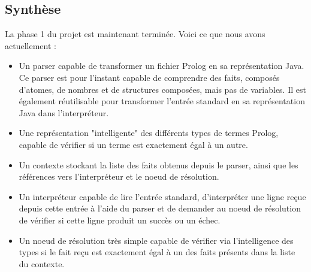 \documentclass[../report.tex]{subfiles}
\begin{document}
\subsection{Synthèse}
La phase 1 du projet est maintenant terminée. Voici ce que nous avons actuellement :
\begin{itemize}
    \item Un parser capable de transformer un fichier Prolog en sa représentation Java. Ce parser est pour l'instant capable de comprendre des faits, composés d'atomes, de nombres et de structures composées, mais pas de variables. Il est également réutilisable pour transformer l'entrée standard en sa représentation Java dans l'interpréteur.
    \item Une représentation "intelligente" des différents types de termes Prolog, capable de vérifier si un terme est exactement égal à un autre.
    \item Un contexte stockant la liste des faits obtenus depuis le parser, ainsi que les références vers l'interpréteur et le noeud de résolution.
    \item Un interpréteur capable de lire l'entrée standard, d'interpréter une ligne reçue depuis cette entrée à l'aide du parser et de demander au noeud de résolution de vérifier si cette ligne produit un succès ou un échec.
    \item Un noeud de résolution très simple capable de vérifier via l'intelligence des types si le fait reçu est exactement égal à un des faits présents dans la liste du contexte.
\end{itemize}
\end{document}
